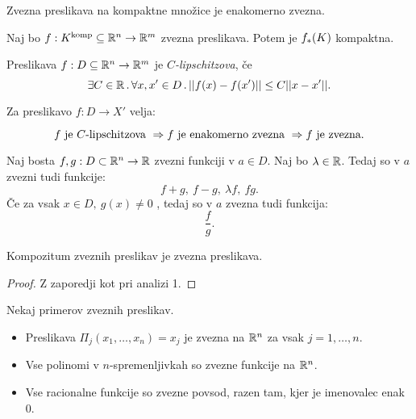 \begin{trditev}
    Zvezna preslikava na kompaktne množice je enakomerno zvezna.
\end{trditev}

\begin{trditev}
    Naj bo $f: K^\text{komp} \subseteq \mathbb{R}^n \to \mathbb{R}^m$ zvezna preslikava. Potem je $f_{*}(K)$ kompaktna.
\end{trditev}

\begin{definicija}
    Preslikava $f: D \subseteq \mathbb{R}^n \to \mathbb{R}^m$ je \emph{$C$-lipschitzova}, če
    $$\exists C \in \mathbb{R} \,.\, \forall x, x' \in D \,.\, ||f(x) - f(x')|| \leq C ||x - x'||.$$
\end{definicija}

\begin{trditev}
    Za preslikavo $f: D \to X'$ velja:

    $$f \text{ je $C$-lipschitzova } \Rightarrow f \text{ je enakomerno zvezna } \Rightarrow f \text{ je zvezna}.$$
\end{trditev}

\begin{trditev}
    Naj bosta $f, g: D \subset \mathbb{R}^n \to \mathbb{R}$ zvezni funkciji v $a \in D$. Naj bo $\lambda \in \mathbb{R}$. Tedaj so v $a$ zvezni tudi funkcije:
    $$f+g, \ f-g, \ \lambda f, \ fg.$$
    Če za vsak $x \in D, \ g(x) \neq 0$ , tedaj so v $a$ zvezna tudi funkcija: 
    $$\frac{f}{g}.$$
\end{trditev}

\begin{trditev}
    Kompozitum zveznih preslikav je zvezna preslikava.
\end{trditev}

\begin{proof}
    Z zaporedji kot pri analizi 1.
\end{proof}

\begin{zgled}
    Nekaj primerov zveznih preslikav.
    \begin{itemize}
        \item Preslikava $\Pi_j(x_1, \ldots, x_n) = x_j$ je zvezna na $\mathbb{R}^n$ za vsak $j = 1, \ldots, n$.
        \item Vse polinomi v $n$-spremenljivkah so zvezne funkcije na $\mathbb{R}^n$.
        \item Vse racionalne funkcije so zvezne povsod, razen tam, kjer je imenovalec enak $0$.
    \end{itemize}
\end{zgled}

